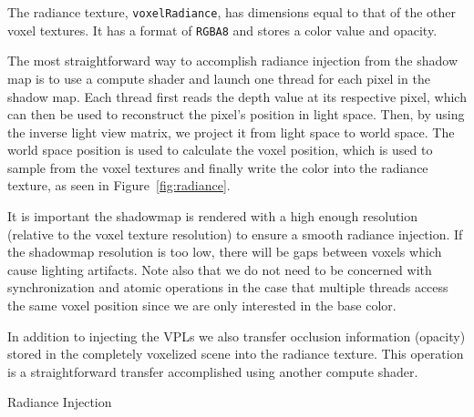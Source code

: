 The radiance texture, \texttt{voxelRadiance}, has dimensions equal to that of the other voxel textures. It has a format of \texttt{RGBA8} and stores a color value and opacity.

The most straightforward way to accomplish radiance injection from the shadow map is to use a compute shader and launch one thread for each pixel in the shadow map. Each thread first reads the depth value at its respective pixel, which can then be used to reconstruct the pixel's position in light space. Then, by using the inverse light view matrix, we project it from light space to world space. The world space position is used to calculate the voxel position, which is used to sample from the voxel textures and finally write the color into the radiance texture, as seen in Figure~\ref{fig:radiance}.

It is important the shadowmap is rendered with a high enough resolution (relative to the voxel texture resolution) to ensure a smooth radiance injection. If the shadowmap resolution is too low, there will be gaps between voxels which cause lighting artifacts. Note also that we do not need to be concerned with synchronization and atomic operations in the case that multiple threads access the same voxel position since we are only interested in the base color.

In addition to injecting the VPLs we also transfer occlusion information (opacity) stored in the completely voxelized scene into the radiance texture. This operation is a straightforward transfer accomplished using another compute shader.



\begin{algorithm}
    \caption{Radiance Injection}
    \label{alg:radianceinjection}
    \begin{algorithmic}
         
         
        \EndFor
    \end{algorithmic}
\end{algorithm}

